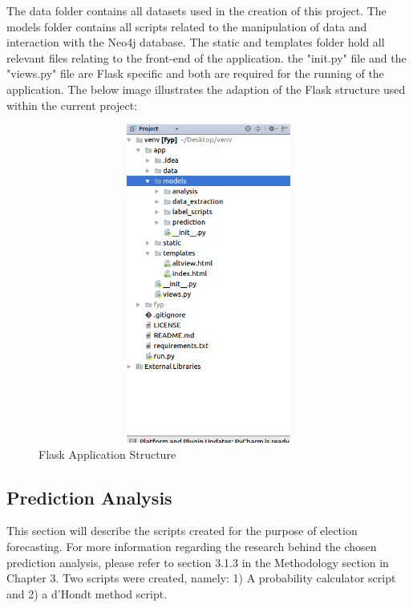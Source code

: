 The data folder contains all datasets used in the creation of this project. The models folder contains all scripts related to the manipulation of data and interaction with the Neo4j database. The static and templates folder hold all relevant files relating to the front-end of the application. the "\textunderscore \textunderscore init.py\textunderscore \textunderscore" file and the "views.py" file are Flask specific and both are required for the running of the application.  The below image illustrates the adaption of the Flask structure used within the current project:

\begin{figure}[h]
	\caption{Flask Application Structure}
	\centering
	\includegraphics[width=15cm, height=10.5cm]{img/flask}
\end{figure}
\pagebreak

\subsection{Prediction Analysis}	
This section will describe the scripts created for the purpose of election forecasting.  For more information regarding the research behind the chosen prediction analysis, please refer to section 3.1.3 in the Methodology section in Chapter 3.  Two scripts were created, namely: 1) A probability calculator script and 2) a d’Hondt method script. 

